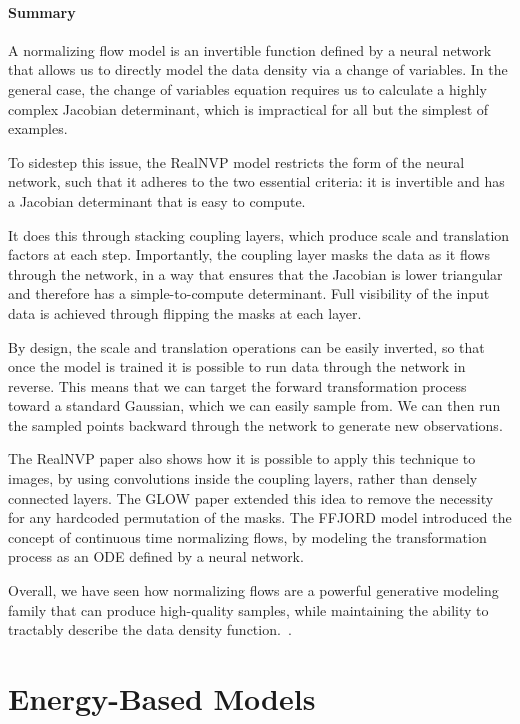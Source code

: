 \paragraph{Summary}

A normalizing flow model is an invertible function defined by a neural network that allows us to directly model the data density via a change of variables.
In the general case, the change of variables equation requires us to calculate a highly complex Jacobian determinant, which is impractical for all but the simplest of examples.

To sidestep this issue, the RealNVP model restricts the form of the neural network, such that it adheres to the two essential criteria: it is invertible and has a Jacobian determinant that is easy to compute.

It does this through stacking coupling layers, which produce scale and translation factors at each step.
Importantly, the coupling layer masks the data as it flows through the network, in a way that ensures that the Jacobian is lower triangular and therefore has a simple-to-compute determinant.
Full visibility of the input data is achieved through flipping the masks at each layer.

By design, the scale and translation operations can be easily inverted, so that once the model is trained it is possible to run data through the network in reverse.
This means that we can target the forward transformation process toward a standard Gaussian, which we can easily sample from.
We can then run the sampled points backward through the network to generate new observations.


The RealNVP paper also shows how it is possible to apply this technique to images, by using convolutions inside the coupling layers, rather than densely connected layers.
The GLOW paper extended this idea to remove the necessity for any hardcoded permutation of the masks.
The FFJORD model introduced the concept of continuous time normalizing flows, by modeling the transformation process as an ODE defined by a neural network.

Overall, we have seen how normalizing flows are a powerful generative modeling family that can produce high-quality samples, while maintaining the ability to tractably describe the data density function.~\cite{foster2022generative}.


\section{Energy-Based Models}


